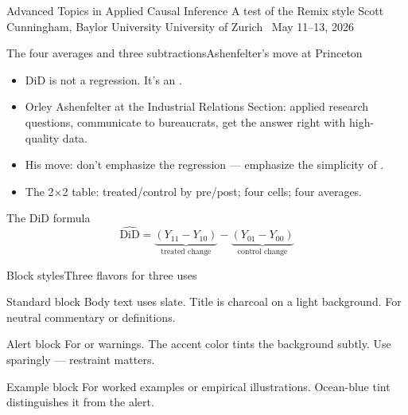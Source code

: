 \documentclass[aspectratio=169,11pt]{beamer}
\begin{document}
\remixtitleframe
  {Advanced Topics in Applied Causal Inference}
  {A test of the Remix style}
  {Scott Cunningham, Baylor University}
  {University of Zurich \textperiodcentered\ May 11--13, 2026}


\begin{frame}{The four averages and three subtractions}{Ashenfelter's move at Princeton}
\begin{itemize}
  \item DiD is not a regression. It's an .
  \item Orley Ashenfelter at the Industrial Relations Section: applied research questions, communicate to bureaucrats, get the answer right with high-quality data.
  \item His move: don't emphasize the regression --- emphasize the simplicity of .
  \item The 2$\times$2 table: treated/control by pre/post; four cells; four averages.
\end{itemize}

\vspace{0.5em}

\begin{block}{The DiD formula}
\[
\widehat{\text{DiD}} = \underbrace{(Y_{11} - Y_{10})}_{\text{treated change}} - \underbrace{(Y_{01} - Y_{00})}_{\text{control change}}
\]
\end{block}
\end{frame}

\begin{frame}{Block styles}{Three flavors for three uses}
\begin{block}{Standard block}
Body text uses slate. Title is charcoal on a light background. For neutral commentary or definitions.
\end{block}

\begin{alertblock}{Alert block}
For  or warnings. The accent color tints the background subtly. Use sparingly --- restraint matters.
\end{alertblock}

\begin{exampleblock}{Example block}
For worked examples or empirical illustrations. Ocean-blue tint distinguishes it from the alert.
\end{exampleblock}
\end{frame}
\end{document}
